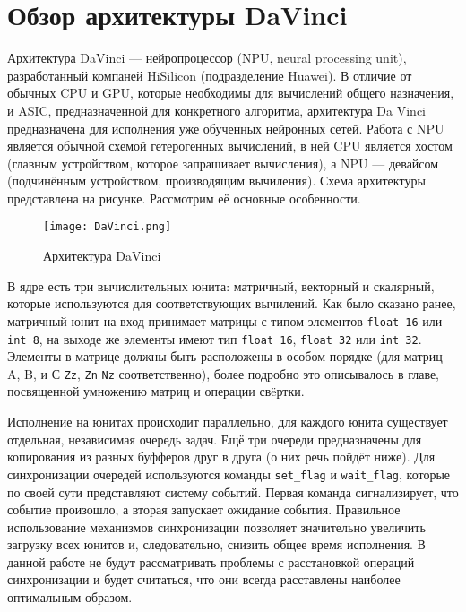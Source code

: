 \section{Обзор архитектуры DaVinci}
\label{sec:Chapter6} 

Архитектура DaVinci --- нейропроцессор (NPU, neural processing unit),
разработанный компаней HiSilicon (подразделение Huawei). В отличие от
обычных CPU и GPU, которые необходимы для вычислений общего назначения,
и ASIC, предназначенной для конкретного алгоритма, архитектура Da Vinci
предназначена для исполнения уже обученных нейронных сетей. Работа с NPU
является обычной схемой гетерогенных вычислений, в ней CPU является хостом
(главным устройством, которое запрашивает вычисления), а NPU --- девайсом
(подчинённым устройством, производящим вычиления). Схема архитектуры
представлена на рисунке. Рассмотрим её основные особенности.

\begin{figure}[h!]
    \centering
    \texttt{[image: DaVinci.png]}
    \caption{Архитектура DaVinci}
\end{figure}

В ядре есть три вычислительных юнита: матричный, векторный и скалярный,
которые используются для соответствующих вычилений. Как было сказано ранее,
матричный юнит на вход принимает матрицы с типом элементов \texttt{float 16}
или \texttt{int 8}, на выходе же элементы имеют тип \texttt{float 16},
\texttt{float 32} или \texttt{int 32}. Элементы в матрице должны быть
расположены в особом порядке (для матриц A, B, и С \texttt{Zz},
\texttt{Zn} \texttt{Nz} соответственно), более подробно это описывалось в главе,
посвященной умножению матриц и операции свëртки. 

Исполнение на юнитах происходит параллельно, для каждого юнита существует
отдельная, независимая очередь задач. Ещё три очереди предназначены для
копирования из разных буфферов друг в друга (о них речь пойдёт ниже).
Для синхронизации очередей используются команды \texttt{set\_flag} и \texttt{wait\_flag},
которые по своей сути представляют систему событий. Первая команда сигнализирует,
что событие произошло, а вторая запускает ожидание события. Правильное
использование механизмов синхронизации позволяет значительно увеличить
загрузку всех юнитов и, следовательно, снизить общее время исполнения.
В данной работе не будут рассматривать проблемы с расстановкой операций
синхронизации и будет считаться, что они всегда расставлены наиболее
оптимальным образом.

